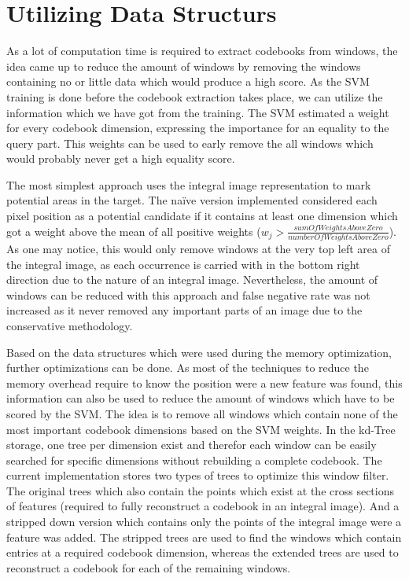\section{Utilizing Data Structurs}
\label{sec:utilizing_data_structures}

As a lot of computation time is required to extract codebooks from windows, the idea came up to reduce the amount of windows by removing the windows containing no or little data which would produce a high score. As the \ac{SVM} training is done before the codebook extraction takes place, we can utilize the information which we have got from the training. The \ac{SVM} estimated a weight for every codebook dimension, expressing the importance for an equality to the query part. This weights can be used to early remove the all windows which would probably never get a high equality score.

The most simplest approach uses the integral image representation to mark potential areas in the target. The na\"{i}ve version implemented considered each pixel position as a potential candidate if it contains at least one dimension which got a weight above the mean of all positive weights ($w_j > \frac{sumOfWeightsAboveZero}{numberOfWeightsAboveZero}$). As one may notice, this would only remove windows at the very top left area of the integral image, as each occurrence is carried with in the bottom right direction due to the nature of an integral image. Nevertheless, the amount of windows can be reduced with this approach and false negative rate was not increased as it never removed any important parts of an image due to the conservative methodology.
\bigskip

Based on the data structures which were used during the memory optimization, further optimizations can be done. As most of the techniques to reduce the memory overhead require to know the position were a new feature was found, this information can also be used to reduce the amount of windows which have to be scored by the \ac{SVM}. The idea is to remove all windows which contain none of the most important codebook dimensions based on the \ac{SVM} weights. In the kd-Tree storage, one tree per dimension exist and therefor each window can be easily searched for specific dimensions without rebuilding a complete codebook. The current implementation stores two types of trees to optimize this window filter. The original trees which also contain the points which exist at the cross sections of features (required to fully reconstruct a codebook in an integral image). And a stripped down version which contains only the points of the integral image were a feature was added. The stripped trees are used to find the windows which contain entries at a required codebook dimension, whereas the extended trees are used to reconstruct a codebook for each of the remaining windows.
\bigskip

